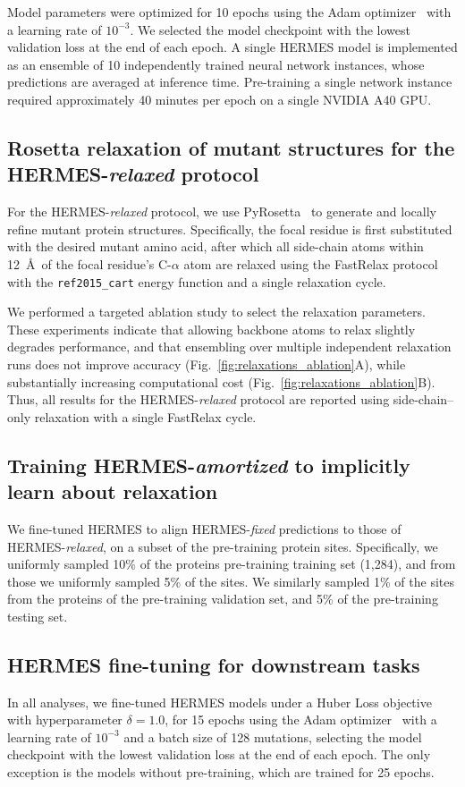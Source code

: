 Model parameters were optimized for 10 epochs using the Adam optimizer~\citep{kingma_adam_2015} with
a learning rate of $10^{-3}$. We selected the model checkpoint with the lowest validation loss at
the end of each epoch. A single HERMES model is implemented as an ensemble of 10 independently
trained neural network instances, whose predictions are averaged at inference time. Pre-training a
single network instance required approximately 40 minutes per epoch on a single NVIDIA A40 GPU.


\subsection{Rosetta relaxation of mutant structures for the HERMES-{\em relaxed} protocol}
For the HERMES-{\em relaxed} protocol, we use PyRosetta~\citep{chaudhury_pyrosetta_2010} to generate
and locally refine mutant protein structures. Specifically, the focal residue is first substituted
with the desired mutant amino acid, after which all side-chain atoms within 12~\AA~of the focal
residue's C-$\alpha$ atom are relaxed using the FastRelax protocol with the \texttt{ref2015\_cart}
energy function and a single relaxation cycle.

We performed a targeted ablation study to select the relaxation parameters. These experiments
indicate that allowing backbone atoms to relax slightly degrades performance, and that ensembling
over multiple independent relaxation runs does not improve accuracy
(Fig.~\ref{fig:relaxations_ablation}A), while substantially increasing computational cost
(Fig.~\ref{fig:relaxations_ablation}B). Thus, all results for the HERMES-{\em relaxed} protocol are
reported using side-chain–only relaxation with a single FastRelax cycle.

\subsection{Training HERMES-\emph{amortized} to implicitly learn about relaxation}
We fine-tuned HERMES to align HERMES-\emph{fixed} predictions to those of HERMES-\emph{relaxed}, on
a subset of the pre-training protein sites. Specifically, we uniformly sampled 10\% of the proteins
pre-training training set (1,284), and from those we uniformly sampled 5\% of the sites. We
similarly sampled 1\% of the sites from the proteins of the pre-training validation set, and 5\% of
the pre-training testing set.

\subsection{HERMES fine-tuning for downstream tasks}
\label{sec:finetuning_details}
In all analyses, we fine-tuned HERMES models under a Huber Loss objective with hyperparameter
$\delta = 1.0$, for 15 epochs using the Adam optimizer~\citep{kingma_adam_2015} with a learning rate
of $10^{-3}$ and a batch size of 128 mutations, selecting the model checkpoint with the lowest
validation loss at the end of each epoch. The only exception is the models without pre-training,
which are trained for 25 epochs.

